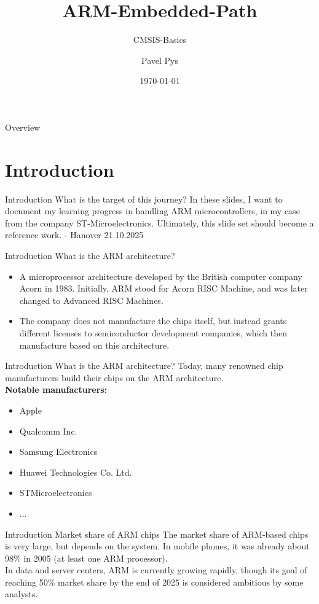 \documentclass{beamer}
\title{ARM-Embedded-Path}
\subtitle{CMSIS-Basics}
\author{Pavel Pys}
\date{\today}
\begin{document}
	\begin{frame}
		\maketitle
	\end{frame}
	\begin{frame}{Overview}
		\tableofcontents
	\end{frame}
\section{Introduction}
\begin{frame}{Introduction}
	{What is the target of this journey?}
	In these slides, I want to document my learning progress in handling ARM microcontrollers, in my case from the company ST-Microelectronics. Ultimately, this slide set should become a reference work. - Hanover 21.10.2025
\end{frame}
\begin{frame}{Introduction}
	{What is the ARM architecture?}
	\begin{itemize}
		\item A microprocessor architecture developed by the British computer company Acorn in 1983. Initially, ARM stood for Acorn RISC Machine, and was later changed to Advanced RISC Machines.
		\item The company does not manufacture the chips itself, but instead grants different licenses to semiconductor development companies, which then manufacture based on this architecture.
	\end{itemize}
\end{frame}
\begin{frame}{Introduction}
	{What is the ARM architecture?}
	Today, many renowned chip manufacturers build their chips on the ARM architecture.\\
	\textbf{Notable manufacturers:}
	\begin{itemize}
		\item Apple
		\item Qualcomm Inc.
		\item Samsung Electronics
		\item Huawei Technologies Co. Ltd.
		\item STMicroelectronics
		\item ...
	\end{itemize}
\end{frame}
\begin{frame}{Introduction}
	{Market share of ARM chips}
	The market share of ARM-based chips is very large, but depends on the system. In mobile phones, it was already about 98\% in 2005 (at least one ARM processor). \\
	\vspace{0.2cm}
	In data and server centers, ARM is currently growing rapidly, though its goal of reaching 50\% market share by the end of 2025 is considered ambitious by some analysts.
\end{frame}
\end{document}
